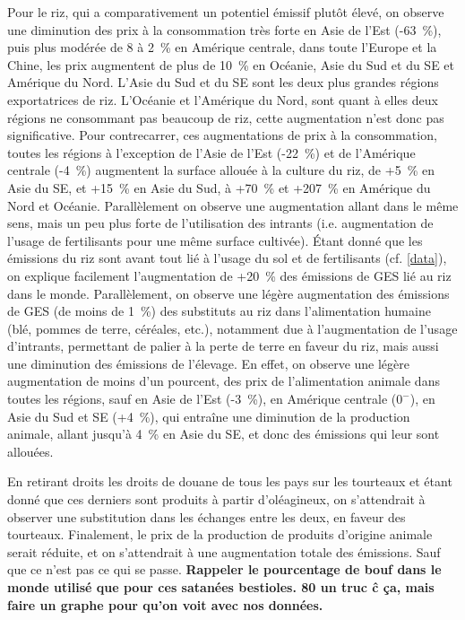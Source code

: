 Pour le riz, qui a comparativement un potentiel émissif plutôt élevé, on observe une diminution des prix à la consommation très forte en Asie de l'Est (-63~\%), puis plus modérée de 8 à 2~\% en Amérique centrale, dans toute l'Europe et la Chine, les prix augmentent de plus de 10~\% en Océanie, Asie du Sud et du SE et Amérique du Nord. L'Asie du Sud et du SE sont les deux plus grandes régions exportatrices de riz. L'Océanie et l'Amérique du Nord, sont quant à elles deux régions ne consommant pas beaucoup de riz, cette augmentation n'est donc pas significative. Pour contrecarrer, ces augmentations de prix à la consommation, toutes les régions à l'exception de l'Asie de l'Est (-22~\%) et de l'Amérique centrale (-4~\%) augmentent la surface allouée à la culture du riz, de +5~\% en Asie du SE, et +15~\% en Asie du Sud, à +70~\% et +207~\% en Amérique du Nord et Océanie. Parallèlement on observe une augmentation allant dans le même sens, mais un peu plus forte de l'utilisation des intrants (i.e. augmentation de l'usage de fertilisants pour une même surface cultivée). Étant donné que les émissions du riz sont avant tout lié à l'usage du sol et de fertilisants (cf. \ref{data}), on explique facilement l'augmentation de +20~\% des émissions de GES lié au riz dans le monde. Parallèlement, on observe une légère augmentation des émissions de GES (de moins de 1~\%) des substituts au riz dans l'alimentation humaine (blé, pommes de terre, céréales, etc.), notamment due à l'augmentation de l'usage d'intrants, permettant de palier à la perte de terre en faveur du riz, mais aussi une diminution des émissions de l'élevage. En effet, on observe une légère augmentation de moins d'un pourcent, des prix de l'alimentation animale dans toutes les régions, sauf en Asie de l'Est (-3~\%), en Amérique centrale ($0^-$), en Asie du Sud et SE (+4~\%), qui entraîne une diminution de la production animale, allant jusqu'à 4~\% en Asie du SE, et donc des émissions qui leur sont allouées.


En retirant droits  les droits de douane de tous les pays sur les tourteaux et étant donné que ces derniers sont produits à partir d'oléagineux, on s'attendrait à observer une substitution dans les échanges entre les deux, en faveur des tourteaux. Finalement, le prix de la production de produits d'origine animale serait réduite, et on s'attendrait à une augmentation totale des émissions. Sauf que ce n'est pas ce qui se passe. \textbf{Rappeler le pourcentage de bouf dans le monde utilisé que pour ces satanées bestioles. 80 un truc ĉ ça, mais faire un graphe pour qu'on voit avec nos données.}



